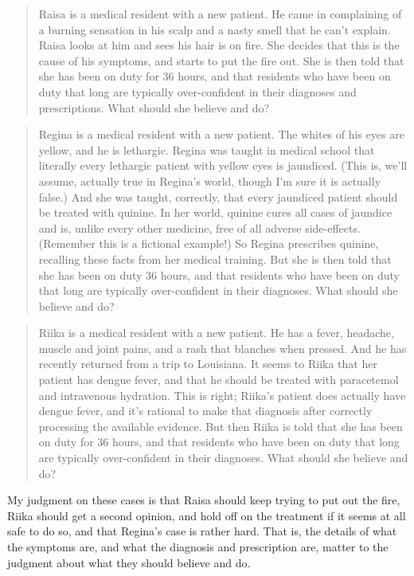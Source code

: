 \begin{quote}
\gls{Raisa} is a medical resident with a new patient. He came in complaining of a burning sensation in his scalp and a nasty smell that he can't explain. \gls{Raisa} looks at him and sees his hair is on fire. She decides that this is the cause of his symptoms, and starts to put the fire out. She is then told that she has been on duty for 36 hours, and that residents who have been on duty that long are typically over-confident in their diagnoses and prescriptions. What should she believe and do?
\end{quote}
\begin{quote}
\gls{Regina} is a medical resident with a new patient. The whites of his eyes are yellow, and he is lethargic. \gls{Regina} was taught in medical school that literally every lethargic patient with yellow eyes is jaundiced. (This is, we'll assume, actually true in Regina's world, though I'm sure it is actually false.) And she was taught, correctly, that every jaundiced patient should be treated with quinine. In her world, quinine cures all cases of jaundice and is, unlike every other medicine, free of all adverse side-effects. (Remember this is a fictional example!) So \gls{Regina} prescribes quinine, recalling these facts from her medical training. But she is then told that she has been on duty 36 hours, and that residents who have been on duty that long are typically over-confident in their diagnoses. What should she believe and do?
\end{quote}
\begin{quote}
\gls{Riika} is a medical resident with a new patient. He has a fever, headache, muscle and joint pains, and a rash that blanches when pressed. And he has recently returned from a trip to Louisiana. It seems to \gls{Riika} that her patient has dengue fever, and that he should be treated with paracetemol and intravenous hydration. This is right; \gls{Riika}'s patient does actually have dengue fever, and it's rational to make that diagnosis after correctly processing the available evidence. But then \gls{Riika} is told that she has been on duty for 36 hours, and that residents who have been on duty that long are typically over-confident in their diagnoses. What should she believe and do?
\end{quote}
My judgment on these cases is that \gls{Raisa} should keep trying to put out the fire, \gls{Riika} should get a second opinion, and hold off on the treatment if it seems at all safe to do so, and that \gls{Regina}'s case is rather hard. That is, the details of what the symptoms are, and what the diagnosis and prescription are, matter to the judgment about what they should believe and do.

